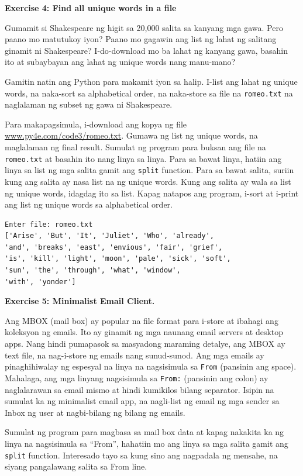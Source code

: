 \documentclass[10pt,]{book}
\begin{document}

\textbf{Exercise 4: Find all unique words in a file}

Gumamit si Shakespeare ng higit sa 20,000 salita sa kanyang mga gawa.
Pero paano mo matutukoy iyon? Paano mo gagawin ang list ng lahat ng
salitang ginamit ni Shakespeare? I-do-download mo ba lahat ng kanyang
gawa, basahin ito at subaybayan ang lahat ng unique words nang
manu-mano?

Gamitin natin ang Python para makamit iyon sa halip. I-list ang lahat ng
unique words, na naka-sort sa alphabetical order, na naka-store sa file
na \texttt{romeo.txt} na naglalaman ng subset ng gawa ni Shakespeare.

Para makapagsimula, i-download ang kopya ng file
\href{http://www.py4e.com/code3/romeo.txt}{www.py4e.com/code3/romeo.txt}.
Gumawa ng list ng unique words, na maglalaman ng final result. Sumulat
ng program para buksan ang file na \texttt{romeo.txt} at basahin ito
nang linya sa linya. Para sa bawat linya, hatiin ang linya sa list ng
mga salita gamit ang \texttt{split} function. Para sa bawat salita,
suriin kung ang salita ay nasa list na ng unique words. Kung ang salita
ay wala sa list ng unique words, idagdag ito sa list. Kapag natapos ang
program, i-sort at i-print ang list ng unique words sa alphabetical
order.

{\small
\begin{verbatim}
Enter file: romeo.txt
['Arise', 'But', 'It', 'Juliet', 'Who', 'already',
'and', 'breaks', 'east', 'envious', 'fair', 'grief',
'is', 'kill', 'light', 'moon', 'pale', 'sick', 'soft',
'sun', 'the', 'through', 'what', 'window',
'with', 'yonder']
\end{verbatim}
}

\textbf{Exercise 5: Minimalist Email Client.}

Ang MBOX (mail box) ay popular na file format para i-store at ibahagi
ang koleksyon ng emails. Ito ay ginamit ng mga naunang email servers at
desktop apps. Nang hindi pumapasok sa masyadong maraming detalye, ang
MBOX ay text file, na nag-i-store ng emails nang sunud-sunod. Ang mga
emails ay pinaghihiwalay ng espesyal na linya na nagsisimula sa
\texttt{From} (pansinin ang space). Mahalaga, ang mga linyang
nagsisimula sa \texttt{From:} (pansinin ang colon) ay naglalarawan sa
email mismo at hindi kumikilos bilang separator. Isipin na sumulat ka ng
minimalist email app, na nagli-list ng email ng mga sender sa Inbox ng
user at nagbi-bilang ng bilang ng emails.

Sumulat ng program para magbasa sa mail box data at kapag nakakita ka ng
linya na nagsisimula sa ``From'', hahatiin mo ang linya sa mga salita
gamit ang \texttt{split} function. Interesado tayo sa kung sino ang
nagpadala ng mensahe, na siyang pangalawang salita sa From line.
\end{document}
